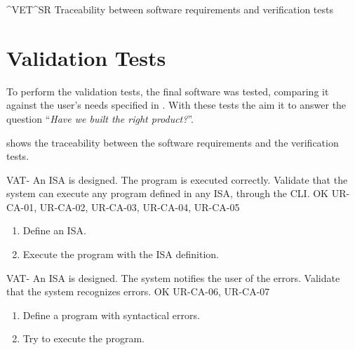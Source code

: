 \begin{landscape}
    {^VET}{^SR}
    {Traceability between software requirements and verification tests}
\end{landscape}



\FloatBarrier


\section{Validation Tests}\label{sec:validation}
To perform the validation tests, the final software was tested, comparing it against the user's needs specified in . With these tests the aim it to answer the question ``\textit{Have we built the right product?}''.

 shows the traceability between the software requirements and the verification tests.

\setcounter{i}{1}

\begin{testCase}{VAT-}
  {An \gls{ISA} is designed.}  %
  {The program is executed correctly.}  %
  {Validate that the system can execute any program defined in any \gls{ISA}, through the CLI.}  %
  {OK}  %
  {UR-CA-01, UR-CA-02, UR-CA-03, UR-CA-04, UR-CA-05}  %
  \begin{enumerate}[leftmargin=*, topsep=0pt, noitemsep]  %
    \item Define an \gls{ISA}.
    \item Execute the program with the \gls{ISA} definition.
  \end{enumerate}
\end{testCase}

\begin{testCase}{VAT-}
  {An \gls{ISA} is designed.}  %
  {The system notifies the user of the errors.}  %
  {Validate that the system recognizes errors.}  %
  {OK}  %
  {UR-CA-06, UR-CA-07}  %
  \begin{enumerate}[leftmargin=*, topsep=0pt, noitemsep]  %
    \item Define a program with syntactical errors.
    \item Try to execute the program.
  \end{enumerate}
\end{testCase}

